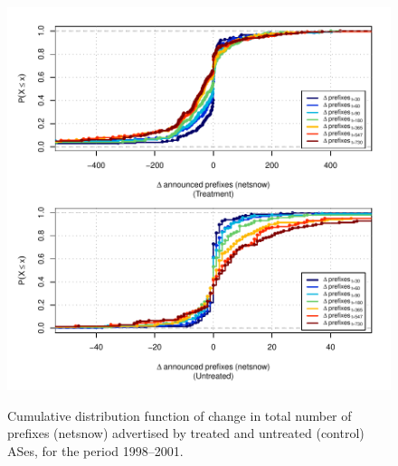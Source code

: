 \begin{figure}[H]
\begin{centering}
\begin{singlespace}
    \includegraphics[width=6in]{figures/behavior-netsnow-1998_2001-corr.pdf}
    \vspace{-2em}\\
    \caption{Cumulative distribution function of change in total number of prefixes (netsnow) advertised by treated and untreated (control) ASes, for the period 1998--2001.}
\end{singlespace}
\end{centering}
\end{figure}
